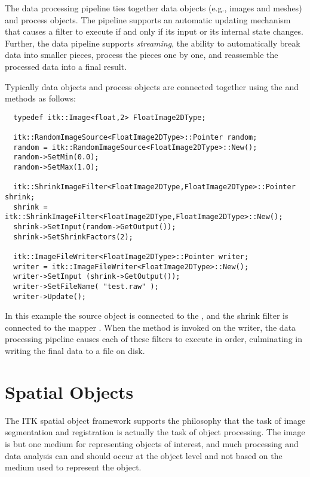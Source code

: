 
The data processing pipeline ties together data objects (e.g., images and
meshes) and process objects. The pipeline supports an automatic updating
mechanism that causes a filter to execute if and only if its input
or its internal state changes. Further, the data pipeline supports
\emph{streaming}, the ability to automatically break data into smaller
pieces, process the pieces one by one, and reassemble the processed data into
a final result.

Typically data objects and process objects are connected together using the
 and  methods as follows:

\small
\begin{verbatim}
  typedef itk::Image<float,2> FloatImage2DType;

  itk::RandomImageSource<FloatImage2DType>::Pointer random;
  random = itk::RandomImageSource<FloatImage2DType>::New();
  random->SetMin(0.0);
  random->SetMax(1.0);

  itk::ShrinkImageFilter<FloatImage2DType,FloatImage2DType>::Pointer shrink;
  shrink = itk::ShrinkImageFilter<FloatImage2DType,FloatImage2DType>::New();
  shrink->SetInput(random->GetOutput());
  shrink->SetShrinkFactors(2);

  itk::ImageFileWriter<FloatImage2DType>::Pointer writer;
  writer = itk::ImageFileWriter<FloatImage2DType>::New();
  writer->SetInput (shrink->GetOutput());
  writer->SetFileName( "test.raw" );
  writer->Update();
\end{verbatim}
\normalsize

In this example the source object  is connected
to the , and the shrink filter is connected to
the mapper . When the  method is
invoked on the writer, the data processing pipeline causes each of these
filters to execute in order, culminating in writing the final data to a file on disk.


\section{Spatial Objects}
\label{sec:SpatialObjectsOverview}

The ITK spatial object framework supports the philosophy that the task of
image segmentation and registration is actually the task of object
processing. The image is but one medium for representing objects of interest,
and much processing and data analysis can and should occur at the object
level and not based on the medium used to represent the object.

